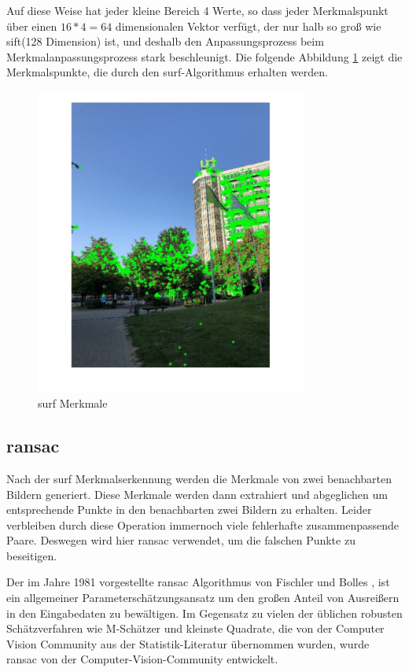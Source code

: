 Auf diese Weise hat jeder kleine Bereich 4 Werte, so dass jeder Merkmalspunkt über einen $16*4=64$ dimensionalen Vektor verfügt, der nur halb so groß wie \gls{sift}(128 Dimension) ist, und deshalb den Anpassungsprozess beim Merkmalanpassungsprozess stark beschleunigt. Die folgende Abbildung \ref{fig:SURF Merkmal} zeigt die Merkmalspunkte, die durch den \gls{surf}-Algorithmus erhalten werden.

\begin{figure}[H]
 \centering 
 \includegraphics[keepaspectratio,width=0.8\textwidth]{images/3_Ersteverfahren/SURF_Detektion.pdf}
 \caption{\gls{surf} Merkmale}
 \label{fig:SURF Merkmal}
\end{figure} 


\subsection{\gls{ransac}}

Nach der \gls{surf} Merkmalserkennung werden die Merkmale von zwei benachbarten Bildern generiert. Diese Merkmale werden dann extrahiert und abgeglichen um entsprechende Punkte in den benachbarten zwei Bildern zu erhalten. Leider verbleiben durch diese Operation immernoch viele fehlerhafte zusammenpassende Paare. Deswegen wird hier \gls{ransac} verwendet, um die falschen Punkte zu beseitigen.

Der im Jahre 1981 vorgestellte \gls{ransac} Algorithmus von Fischler und Bolles \cite{ransac1}, ist ein allgemeiner Parameterschätzungsansatz um den großen Anteil von Ausreißern in den Eingabedaten zu bewältigen. Im Gegensatz zu vielen der üblichen robusten Schätzverfahren wie M-Schätzer und kleinste Quadrate, die von der Computer Vision Community aus der Statistik-Literatur übernommen wurden, wurde \gls{ransac} von der Computer-Vision-Community entwickelt. 

